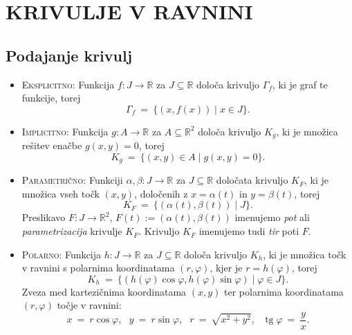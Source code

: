 \documentclass[11pt]{article}
\DeclareMathOperator{\tg}{tg}
\theoremstyle{definition}
\theoremstyle{definition}
\theoremstyle{definition}
\theoremstyle{theorem}
\begin{document}

\pagebreak


\section{KRIVULJE V RAVNINI}
\vspace{0.5cm}


\subsection{Podajanje krivulj}
\vspace{0.5cm}

\begin{itemize}
	\item \textsc{Eksplicitno:} Funkcija $f: J \rightarrow \mathbb{R}$ za $J \subseteq \mathbb{R}$ določa krivuljo $\Gamma_f$, ki je graf te funkcije, torej
	$$\Gamma_f ~=~ \{(x, f(x)) \mid x \in J\}.$$
	\item \textsc{Implicitno:} Funkcija $g: A \rightarrow \mathbb{R}$ za $A \subseteq \mathbb{R}^2$ določa krivuljo $K_g$, ki je množica rešitev enačbe $g(x, y) = 0$, torej
	$$K_g ~=~ \{(x, y) \in A \mid g(x, y) = 0\}.$$
	\item \textsc{Parametrično:} Funkciji $\alpha, \beta: J \rightarrow \mathbb{R}$ za $J \subseteq \mathbb{R}$ določata krivuljo $K_F$, ki je množica vseh točk $(x, y)$, določenih z $x = \alpha(t)$ in $y = \beta(t)$, torej
	$$K_F ~=~ \{(\alpha(t), \beta(t)) \mid J\}.$$
	Preslikavo $F: J \rightarrow \mathbb{R}^2$, $F(t) := (\alpha(t), \beta(t))$ imenujemo \textit{pot} ali \\\textit{parametrizacija} krivulje $K_F$. Krivuljo $K_F$ imenujemo tudi \textit{tir} poti $F$.
	\item \textsc{Polarno:} Funkcija $h: J \rightarrow \mathbb{R}$ za $J \subseteq \mathbb{R}$ določa krivuljo $K_h$, ki je množica točk v ravnini s polarnima koordinatama $(r, \varphi)$, kjer je $r = h(\varphi)$, torej
	$$K_h ~=~ \{(h(\varphi)\cos{\varphi}, h(\varphi)\sin{\varphi}) \mid \varphi \in J\}.$$
	Zveza med kartezičnima koordinatama $(x, y)$ ter polarnima \hbox{koordinatama} $(r, \varphi)$ točje v ravnini:
	$$x ~=~ r \cos{\varphi}, ~~~y ~=~ r \sin{\varphi}, ~~~r ~=~ \sqrt{x^2 + y^2}, ~~~\tg{\varphi} ~=~ \frac{y}{x}.$$
\end{itemize}
\vspace{0.5cm}
\end{document}

